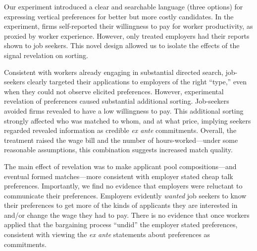 \documentclass[12pt]{article}
\begin{document}

Our experiment introduced a clear and searchable language (three options) for expressing vertical preferences for better but more costly candidates. 
In the experiment, firms self-reported their willingness to pay for worker productivity, as proxied by worker experience.
However, only treated employers had their reports shown to job seekers.
This novel design allowed us to isolate the effects of the signal revelation on sorting. 

Consistent with workers already engaging in substantial directed search, job-seekers clearly targeted their applications to employers of the right ``type,'' even when they could not observe elicited preferences.
However, experimental revelation of preferences caused substantial additional sorting.
Job-seekers avoided firms revealed to have a low willingness to pay. 
This additional sorting strongly affected who was matched to whom, and at what price, implying seekers regarded revealed information as credible \emph{ex ante} commitments. 
Overall, the treatment raised the wage bill and the number of hours-worked---under some reasonable assumptions, this combination suggests increased match quality. 

The main effect of revelation was to make applicant pool compositions---and eventual formed matches---more consistent with employer stated cheap talk preferences.
Importantly, we find no evidence that employers were reluctant to communicate their preferences.
Employers evidently \emph{wanted} job seekers to know their preferences to get more of the kinds of applicants they are interested in and/or change the wage they had to pay.
There is no evidence that once workers applied that the bargaining process ``undid'' the employer stated preferences, consistent with viewing the \emph{ex ante} statements about preferences as commitments.   
\end{document}
